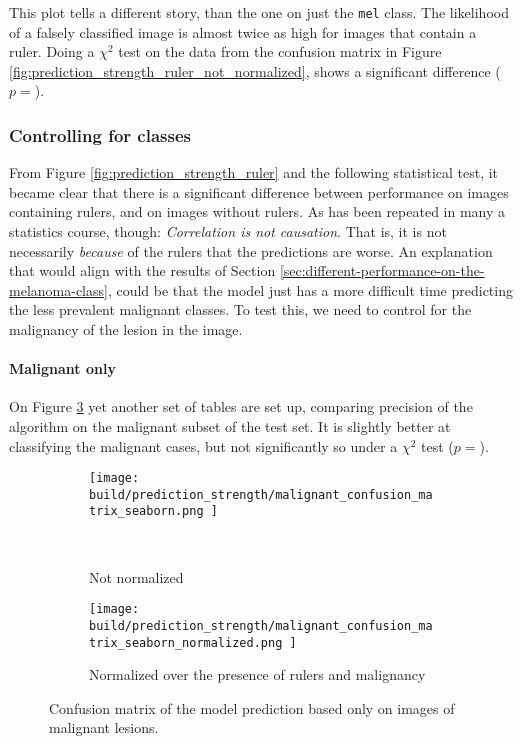 This plot tells a different story, than the one on just the \verb|mel| class.
The likelihood of a falsely classified image is almost twice as high for images
that contain a ruler.
Doing a $\chi^2$ test on the data from the confusion matrix in Figure \ref{fig:prediction_strength_ruler_not_normalized},
shows a significant difference ($p=$).

\subsubsection{Controlling for classes}
From Figure \ref{fig:prediction_strength_ruler} and the following statistical test,
it became clear that there is a significant difference between performance on images containing rulers,
and on images without rulers.
As has been repeated in many a statistics course, though:
\textit{Correlation is not causation}.
That is, it is not necessarily \textit{because} of the rulers that the predictions are worse.
An explanation that would align with the results of Section \ref{sec:different-performance-on-the-melanoma-class},
could be that the model just has a more difficult time predicting the less prevalent malignant classes.
To test this, we need to control for the malignancy of the lesion in the image.

\paragraph{Malignant only}
On Figure \ref{fig:prediction_strength_ruler_malignant} yet another set of tables are set up,
comparing precision of the algorithm on the malignant subset of the test set.
It is slightly better at classifying the malignant cases, but not
significantly so under a $\chi^2$ test ($p=$).

\begin{figure}[h]
    \centering
    \begin{subfigure}[h]{0.45\textwidth}
        \texttt{[image: 
            build/prediction\_strength/malignant\_confusion\_matrix\_seaborn.png
        ]}
        \caption{Not normalized}
        \label{fig:prediction_strength_ruler_malignant_not_normalized}\
    \end{subfigure}
    \begin{subfigure}[h]{0.45\textwidth}
        \texttt{[image: 
            build/prediction\_strength/malignant\_confusion\_matrix\_seaborn\_normalized.png
        ]}
        \caption{Normalized over the presence of rulers and malignancy}
        \label{fig:prediction_strength_ruler_normalized_malignant}
    \end{subfigure}
    \caption{Confusion matrix of the model prediction based only on images of malignant lesions.}
    \label{fig:prediction_strength_ruler_malignant}
\end{figure}


